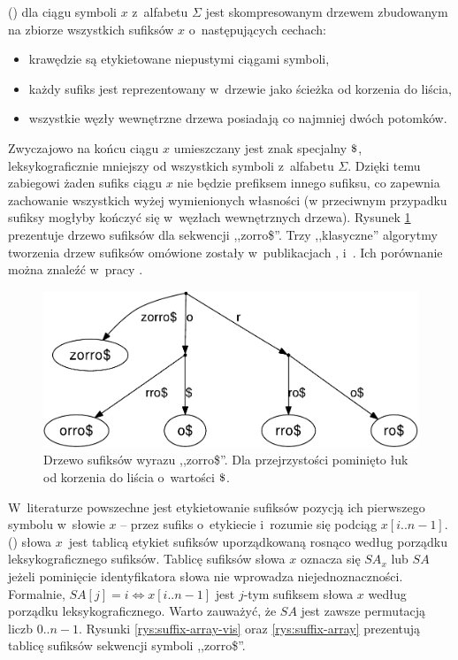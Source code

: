  () \cite{gusfield} dla ciągu symboli
$x$ z~alfabetu $\Sigma$ jest skompresowanym drzewem zbudowanym na zbiorze wszystkich sufiksów
$x$ o~następujących cechach:
\begin{itemize}
  \item krawędzie są etykietowane niepustymi ciągami symboli,
  \item każdy sufiks jest reprezentowany w~drzewie jako ścieżka od korzenia
  do liścia,
  \item wszystkie węzły wewnętrzne drzewa posiadają co najmniej dwóch
  potomków.
\end{itemize}

Zwyczajowo na końcu ciągu $x$ umieszczany jest znak specjalny $\dollar$,
leksykograficznie mniejszy od wszystkich symboli z~alfabetu $\Sigma$. Dzięki temu zabiegowi
żaden sufiks ciągu $x$ nie będzie prefiksem innego sufiksu, co zapewnia zachowanie wszystkich wyżej
wymienionych własności (w przeciwnym przypadku sufiksy mogłyby kończyć się
w~węzłach wewnętrznych drzewa). Rysunek \ref{rys:suffix-tree} prezentuje
drzewo sufiksów dla sekwencji ,,zorro\$''. Trzy ,,klasyczne'' algorytmy
tworzenia drzew sufiksów omówione zostały w~publikacjach \cite{weiner}, \cite{mccreight} 
i~\cite{ukkonen}. Ich porównanie można znaleźć w~pracy \cite{from-ukkonen}.

\begin{figure}[t]
    \begin{center}
        \includegraphics[scale=0.5]{figures/zorroST.pdf}
    \end{center}
    \caption{Drzewo sufiksów wyrazu ,,zorro\$''. Dla przejrzystości pominięto łuk od korzenia do
    liścia o~wartości $\dollar$.}%
    \label{rys:suffix-tree}
\end{figure}

W~literaturze powszechne jest etykietowanie sufiksów pozycją
ich pierwszego symbolu w~słowie $x$ -- przez sufiks o~etykiecie i~rozumie
się podciąg $x[i..n-1]$.  () \cite{taxonomy} słowa $x$~jest tablicą etykiet sufiksów uporządkowaną rosnąco według porządku
leksykograficznego sufiksów.
Tablicę sufiksów słowa $x$ oznacza się $\textit{SA}_x$ lub $\textit{SA}$ jeżeli pominięcie
identyfikatora słowa nie wprowadza niejednoznaczności. Formalnie,
$\textit{SA}[j] = i \iff x[i..n-1]$ jest $j$-tym sufiksem
słowa $x$ według porządku leksykograficznego. Warto zauważyć, że
$\textit{SA}$ jest zawsze permutacją liczb $0..n-1$. Rysunki
\ref{rys:suffix-array-vis} oraz \ref{rys:suffix-array}
prezentują tablicę sufiksów sekwencji symboli ,,zorro\$''.

